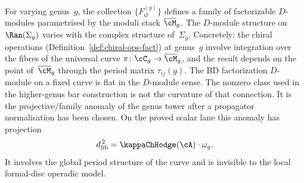 \begin{remark}
\label{rem:families-over-Mbar}
For varying genus~$g$, the collection $\{F_{\mathsf{cl}}^{(g)}\}$
defines a family of factorizable $D$-modules parametrised by the
moduli stack $\Mbar_g$. The $D$-module structure on
$\Ran(\Sigma_g)$ varies with the complex structure of~$\Sigma_g$.
Concretely: the chiral operations
(Definition~\ref{def:chiral-ops-fact}) at genus~$g$ involve
integration over the fibres of the universal curve
$\pi\colon \cC_g \to \Mbar_g$, and the result depends on the
point of~$\Mbar_g$ through the period matrix $\tau_{ij}(g)$.
The BD factorization $D$-module on a fixed curve is flat in the
$D$-module sense. The nonzero class used in the higher-genus bar
construction is not the curvature of that connection. It is the
projective/family anomaly of the genus tower after a propagator
normalisation has been chosen. On the proved scalar lane this
anomaly has projection
\[
\dfib^{\,2}=\kappaChHodge(\cA)\cdot\omega_g .
\]
It involves the global period structure of the curve and is
invisible to the local formal-disc operadic model.
\end{remark}

